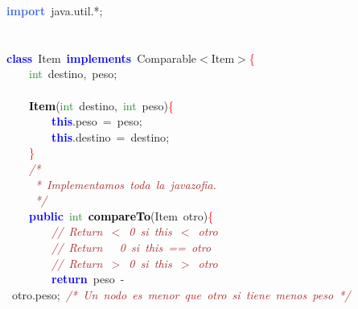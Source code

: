 
{\ttfamily \raggedright {
\noindent
\mbox{}\textbf{\textcolor{RoyalBlue}{import}}\ java\textcolor{BrickRed}{.}util\textcolor{BrickRed}{.*;} \\
\mbox{} \\
\mbox{} \\
\mbox{}\textbf{\textcolor{Blue}{class}}\ Item\ \textbf{\textcolor{Blue}{implements}}\ Comparable\textcolor{BrickRed}{$<$}Item\textcolor{BrickRed}{$>$}\textcolor{Red}{\{} \\
\mbox{}\ \ \ \ \textcolor{ForestGreen}{int}\ destino\textcolor{BrickRed}{,}\ peso\textcolor{BrickRed}{;} \\
\mbox{} \\
\mbox{}\ \ \ \ \textbf{\textcolor{Black}{Item}}\textcolor{BrickRed}{(}\textcolor{ForestGreen}{int}\ destino\textcolor{BrickRed}{,}\ \textcolor{ForestGreen}{int}\ peso\textcolor{BrickRed}{)}\textcolor{Red}{\{} \\
\mbox{}\ \ \ \ \ \ \ \ \textbf{\textcolor{Blue}{this}}\textcolor{BrickRed}{.}peso\ \textcolor{BrickRed}{=}\ peso\textcolor{BrickRed}{;} \\
\mbox{}\ \ \ \ \ \ \ \ \textbf{\textcolor{Blue}{this}}\textcolor{BrickRed}{.}destino\ \textcolor{BrickRed}{=}\ destino\textcolor{BrickRed}{;} \\
\mbox{}\ \ \ \ \textcolor{Red}{\}} \\
\mbox{}\ \ \ \ \textit{\textcolor{Brown}{/*}} \\
\mbox{}\textit{\textcolor{Brown}{\ \ \ \ \ *\ Implementamos\ toda\ la\ javazofia.}} \\
\mbox{}\textit{\textcolor{Brown}{\ \ \ \ \ */}} \\
\mbox{}\ \ \ \ \textbf{\textcolor{Blue}{public}}\ \textcolor{ForestGreen}{int}\ \textbf{\textcolor{Black}{compareTo}}\textcolor{BrickRed}{(}Item\ otro\textcolor{BrickRed}{)}\textcolor{Red}{\{} \\
\mbox{}\ \ \ \ \ \ \ \ \textit{\textcolor{Brown}{//\ Return\ $<$\ 0\ si\ this\ $<$\ otro}} \\
\mbox{}\ \ \ \ \ \ \ \ \textit{\textcolor{Brown}{//\ Return\ \ \ 0\ si\ this\ ==\ otro}} \\
\mbox{}\ \ \ \ \ \ \ \ \textit{\textcolor{Brown}{//\ Return\ $>$\ 0\ si\ this\ $>$\ otro\ \ }} \\
\mbox{}\ \ \ \ \ \ \ \ \textbf{\textcolor{Blue}{return}}\ peso\ \textcolor{BrickRed}{-}\ otro\textcolor{BrickRed}{.}peso\textcolor{BrickRed}{;}\ \textit{\textcolor{Brown}{/*\ Un\ nodo\ es\ menor\ que\ otro\ si\ tiene\ menos\ peso\ */}} \\
}}
